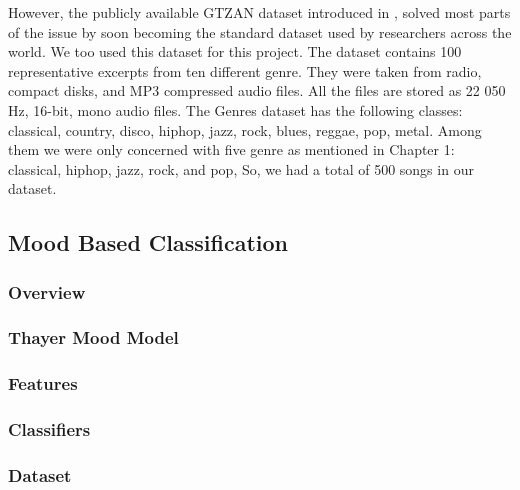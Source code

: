 However, the publicly available GTZAN dataset introduced in \cite{Tzanetakis2002}, solved most parts of the issue by soon becoming the standard dataset used by researchers across the world.
We too used this dataset for this project.
The dataset contains 100 representative excerpts from ten different genre.
They were taken from radio, compact disks, and MP3 compressed audio files. All the files are stored as 22 050 Hz, 16-bit, mono audio files. 
The Genres dataset has the following classes: classical, country, disco, hiphop, jazz, rock, blues, reggae, pop, metal.
Among them we were only concerned with five genre as mentioned in Chapter 1: classical, hiphop, jazz, rock, and pop, So, we had a total of 500 songs in our dataset. 

\subsection{Mood Based Classification}

\subsubsection{Overview}

\subsubsection{Thayer Mood Model}

\subsubsection{Features}

\subsubsection{Classifiers}

\subsubsection{Dataset}



